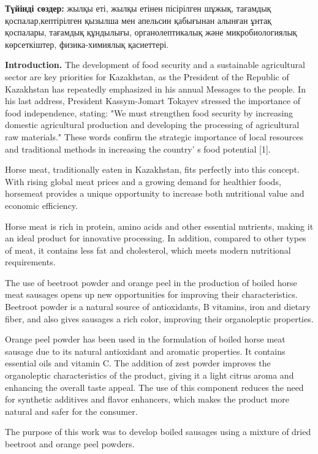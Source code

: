 {\bfseries Түйінді сөздер:} жылқы еті, жылқы етінен пісірілген шұжық,
тағамдық қоспалар,кептірілген қызылша мен апельсин қабығынан алынған
ұнтақ қоспалары, тағамдық құндылығы, органолептикалық және
микробиологиялық көрсеткіштер, физика-химиялық қасиеттері.

\begin{multicols}{2}
{\bfseries Introduction.} The development of food security and a
sustainable agricultural sector are key priorities for Kazakhstan, as
the President of the Republic of Kazakhstan has repeatedly emphasized in
his annual Messages to the people. In his last address, President
Kassym-Jomart Tokayev stressed the importance of food independence,
stating: "We must strengthen food security by increasing domestic
agricultural production and developing the processing of agricultural
raw materials." These words confirm the strategic importance of local
resources and traditional methods in increasing the
country' s food potential {[}1{]}.

Horse meat, traditionally eaten in Kazakhstan, fits perfectly into this
concept. With rising global meat prices and a growing demand for
healthier foods, horsemeat provides a unique opportunity to increase
both nutritional value and economic efficiency.

Horse meat is rich in protein, amino acids and other essential
nutrients, making it an ideal product for innovative processing. In
addition, compared to other types of meat, it contains less fat and
cholesterol, which meets modern nutritional requirements.

The use of beetroot powder and orange peel in the production of boiled
horse meat sausages opens up new opportunities for improving their
characteristics. Beetroot powder is a natural source of antioxidants, B
vitamins, iron and dietary fiber, and also gives sausages a rich color,
improving their organoleptic properties.

Orange peel powder has been used in the formulation of boiled horse meat
sausage due to its natural antioxidant and aromatic properties. It
contains essential oils and vitamin C. The addition of zest powder
improves the organoleptic characteristics of the product, giving it a
light citrus aroma and enhancing the overall taste appeal. The use of
this component reduces the need for synthetic additives and flavor
enhancers, which makes the product more natural and safer for the
consumer.

The purpose of this work was to develop boiled sausages using a mixture
of dried beetroot and orange peel powders.


\end{multicols}
